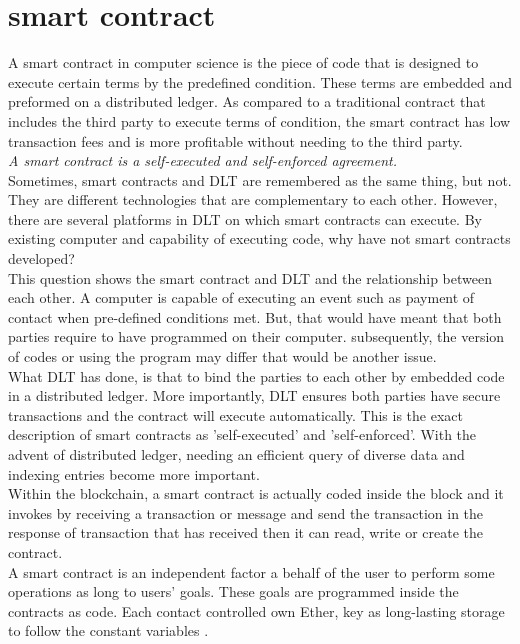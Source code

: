 \section{smart contract}
A smart contract in computer science is the piece of code that is designed to execute certain terms by the predefined condition. These terms are embedded and preformed on a distributed ledger. As compared to a traditional contract that includes the third party to execute terms of condition, the smart contract has low transaction fees and is more profitable without needing to the third party.\\
\textit{A smart contract is a self-executed and self-enforced agreement.}\\
Sometimes, smart contracts and DLT are remembered as the same thing, but not. They are different technologies that are complementary to each other. However, there are several platforms in DLT on which smart contracts can execute. By existing computer and capability of executing code, why have not smart contracts developed?\\
This question shows the smart contract and DLT and the relationship between each other.
A computer is capable of executing an event such as payment of contact when pre-defined conditions met. But, that would have meant that both parties require to have programmed on their computer. subsequently, the version of codes or using the program may differ that would be another issue. \\
What DLT has done, is that to bind the parties to each other by embedded code in a distributed ledger. More importantly, DLT ensures both parties have secure transactions and the contract will execute automatically. This is the exact description of smart contracts as 'self-executed' and 'self-enforced'. 
With the advent of distributed ledger, needing an efficient query of diverse data and indexing entries become more important.\\
Within the blockchain, a smart contract is actually coded inside the block and it invokes by receiving a transaction or message and send the transaction in the response of transaction that has received then it can read, write or create the contract. \\
A smart contract is an independent factor a behalf of the user to perform some operations as long to users' goals. These goals are programmed inside the contracts as code. Each contact controlled own Ether, key as long-lasting storage to follow the constant variables \cite{Egbertsen}.\\
